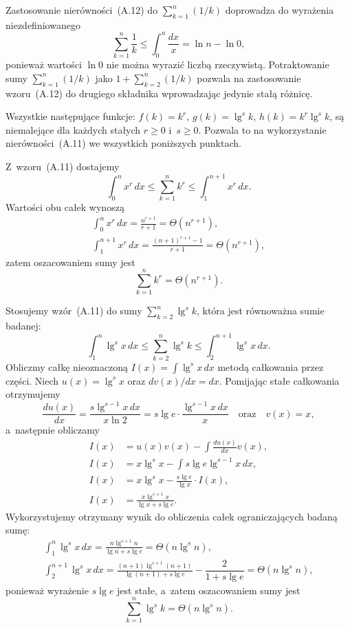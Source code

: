 \exercise %
Zastosowanie nierówności~(A.12) do $\sum_{k=1}^n(1/k)$ doprowadza do wyrażenia niezdefiniowanego
\[
	\sum_{k=1}^n\frac{1}{k} \le \int_0^n\frac{dx}{x} = \ln n-\ln 0,
\]
ponieważ wartości $\ln0$ nie można wyrazić liczbą rzeczywistą. Potraktowanie sumy $\sum_{k=1}^n(1/k)$ jako $1+\sum_{k=2}^n(1/k)$ pozwala na zastosowanie wzoru~(A.12) do drugiego składnika wprowadzając jedynie stałą różnicę.

\problems

Wszystkie następujące funkcje: $f(k)=k^r$, $g(k)=\lg^sk$, $h(k)=k^r\lg^sk$, są niemalejące dla każdych stałych $r\ge0$ i~$s\ge0$. Pozwala to na wykorzystanie nierówności~(A.11) we wszystkich poniższych punktach.

\subproblem %
Z~wzoru~(A.11) dostajemy
\[
	\int_0^nx^r\,dx \le \sum_{k=1}^nk^r \le \int_1^{n+1}x^r\,dx.
\]
Wartości obu całek wynoszą
\begin{gather*}
	\int_0^nx^r\,dx = \frac{n^{r+1}}{r+1} = \Theta(n^{r+1}), \\[2mm]
	\int_1^{n+1}x^r\,dx = \frac{(n+1)^{r+1}-1}{r+1} = \Theta(n^{r+1}),
\end{gather*}
zatem oszacowaniem sumy jest
\[
	\sum_{k=1}^nk^r = \Theta(n^{r+1}).
\]

\subproblem %
Stosujemy wzór~(A.11) do sumy $\sum_{k=2}^n\lg^sk$, która jest równoważna sumie badanej:
\[
	\int_1^n\lg^sx\,dx \le \sum_{k=2}^n\lg^sk \le \int_2^{n+1}\lg^sx\,dx.
\]
Obliczmy całkę nieoznaczoną $I(x) = \int\lg^sx\,dx$ metodą całkowania przez części. Niech $u(x)=\lg^sx$ oraz $dv(x)/dx=dx$. Pomijając stałe całkowania otrzymujemy
\[
	\frac{du(x)}{dx} = \frac{s\lg^{s-1}x\,dx}{x\ln 2} = s\lg e\cdot\frac{\lg^{s-1}x\,dx}{x} \quad\text{oraz}\quad v(x) = x,
\]
a~następnie obliczamy
\begin{align*}
	I(x) &= u(x)v(x)-\int\frac{du(x)}{dx}v(x), \\
	I(x) &= x\lg^sx-\int s\lg e\lg^{s-1}x\,dx, \\
	I(x) &= x\lg^sx-\frac{s\lg e}{\lg x}\cdot I(x), \\
	I(x) &= \frac{x\lg^{s+1}x}{\lg x+s\lg e}.
\end{align*}
Wykorzystujemy otrzymany wynik do obliczenia całek ograniczających badaną sumę:
\begin{gather*}
	{\int_1^n\lg^sx\,dx} = \frac{n\lg^{s+1}n}{\lg n+s\lg e} = \Theta(n\lg^sn), \\[2mm]
	{\int_2^{n+1}\lg^sx\,dx} = \frac{(n+1)\lg^{s+1}(n+1)}{\lg(n+1)+s\lg e}-\dfrac{2}{1+s\lg e} = \Theta(n\lg^sn),
\end{gather*}
ponieważ wyrażenie $s\lg e$ jest stałe, a~zatem oszacowaniem sumy jest
\[
	\sum_{k=1}^n\lg^sk = \Theta(n\lg^sn).
\]

